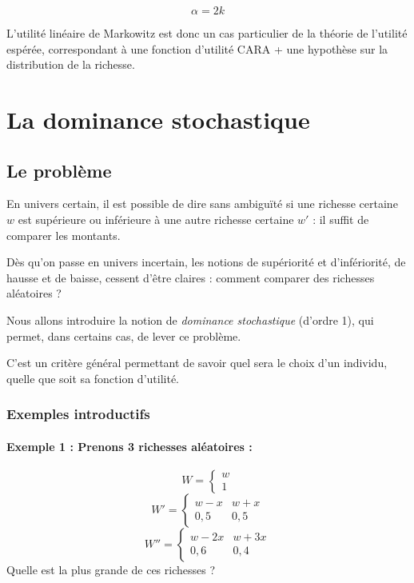 \documentclass[a4paper, 12pt]{report}
\begin{document}
\[
\alpha = 2k
\]

L'utilité linéaire de Markowitz est donc un cas particulier de la théorie de l'utilité espérée, correspondant à une fonction d'utilité CARA + une hypothèse sur la distribution de la richesse.


\chapter{La dominance stochastique}

\section{Le problème}

En univers certain, il est possible de dire sans ambiguïté si une richesse certaine \( w \) est supérieure ou inférieure à une autre richesse certaine \( w' \) : il suffit de comparer les montants.

Dès qu'on passe en univers incertain, les notions de supériorité et d'infériorité, de hausse et de baisse, cessent d'être claires : comment comparer des richesses aléatoires ?

Nous allons introduire la notion de \textit{dominance stochastique} (d'ordre 1), qui permet, dans certains cas, de lever ce problème.

C'est un critère général permettant de savoir quel sera le choix d'un individu, quelle que soit sa fonction d'utilité.

\subsection{Exemples introductifs}

\subsubsection{Exemple 1 : Prenons 3 richesses aléatoires : }
\[
W = 
\begin{cases} 
	w \\
	1 
\end{cases} 
\]
\[
W' = 
\begin{cases} 
	w - x &  w + x\\ 
	 0{,}5& 0{,}5 
\end{cases} 
\]
\[
W'' = 
\begin{cases} 
	w - 2x & w + 3x  \\ 
	0{,}6 & 0{,}4 
\end{cases} 
\]
Quelle est la plus grande de ces richesses ?
\end{document}
